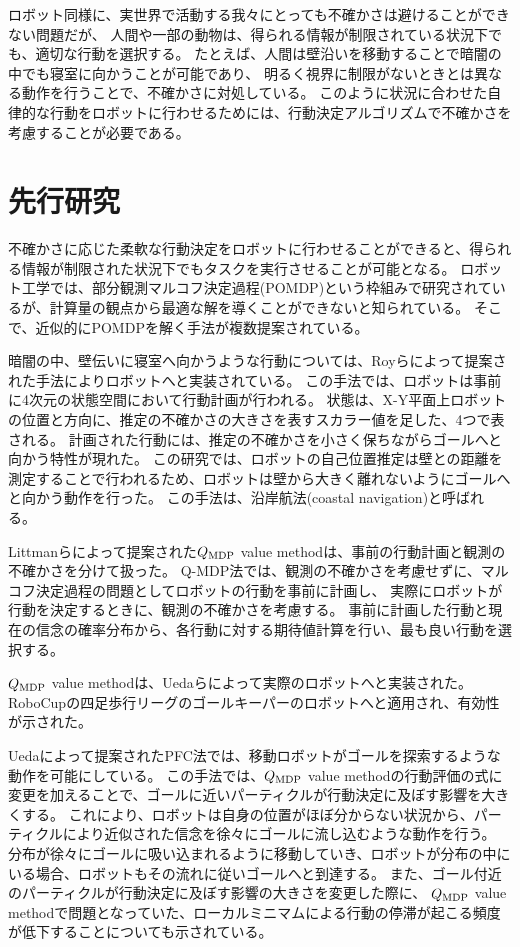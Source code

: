 ロボット同様に、実世界で活動する我々にとっても不確かさは避けることができない問題だが、
人間や一部の動物は、得られる情報が制限されている状況下でも、適切な行動を選択する。
たとえば、人間は壁沿いを移動することで暗闇の中でも寝室に向かうことが可能であり、
明るく視界に制限がないときとは異なる動作を行うことで、不確かさに対処している。
このように状況に合わせた自律的な行動をロボットに行わせるためには、行動決定アルゴリズムで不確かさを考慮することが必要である。


\section{先行研究}

不確かさに応じた柔軟な行動決定をロボットに行わせることができると、得られる情報が制限された状況下でもタスクを実行させることが可能となる。
ロボット工学では、部分観測マルコフ決定過程(POMDP)という枠組みで研究されているが、計算量の観点から最適な解を導くことができないと知られている\cite{kaelbling1998}。
そこで、近似的にPOMDPを解く手法が複数提案されている。

暗闇の中、壁伝いに寝室へ向かうような行動については、Royらによって提案された手法によりロボットへと実装されている\cite{roy1999b}。
この手法では、ロボットは事前に4次元の状態空間において行動計画が行われる。
状態は、X-Y平面上ロボットの位置と方向に、推定の不確かさの大きさを表すスカラー値を足した、4つで表される。
計画された行動には、推定の不確かさを小さく保ちながらゴールへと向かう特性が現れた。
この研究では、ロボットの自己位置推定は壁との距離を測定することで行われるため、ロボットは壁から大きく離れないようにゴールへと向かう動作を行った。
この手法は、沿岸航法(coastal navigation)と呼ばれる。

Littmanらによって提案された$Q_{\rm MDP}$ value method\cite{littman1995}は、事前の行動計画と観測の不確かさを分けて扱った。
Q-MDP法では、観測の不確かさを考慮せずに、マルコフ決定過程の問題としてロボットの行動を事前に計画し、
実際にロボットが行動を決定するときに、観測の不確かさを考慮する。
事前に計画した行動と現在の信念の確率分布から、各行動に対する期待値計算を行い、最も良い行動を選択する。

$Q_{\rm MDP}$ value methodは、Uedaらによって実際のロボットへと実装された\cite{ueda2003iros}。
RoboCupの四足歩行リーグのゴールキーパーのロボットへと適用され、有効性が示された。

Uedaによって提案されたPFC法では、移動ロボットがゴールを探索するような動作を可能にしている\cite{ueda2015}。
この手法では、$Q_{\rm MDP}$ value methodの行動評価の式に変更を加えることで、ゴールに近いパーティクルが行動決定に及ぼす影響を大きくする。
これにより、ロボットは自身の位置がほぼ分からない状況から、パーティクルにより近似された信念を徐々にゴールに流し込むような動作を行う。
分布が徐々にゴールに吸い込まれるように移動していき、ロボットが分布の中にいる場合、ロボットもその流れに従いゴールへと到達する。
また、ゴール付近のパーティクルが行動決定に及ぼす影響の大きさを変更した際に、
$Q_{\rm MDP}$ value methodで問題となっていた、ローカルミニマムによる行動の停滞が起こる頻度が低下することについても示されている\cite{ueda2018searching}。

